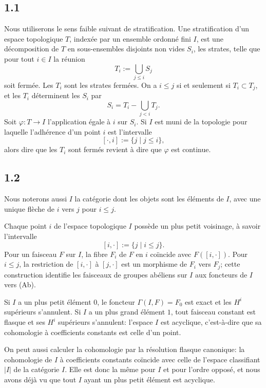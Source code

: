 \documentclass[11pt]{article}
\theoremstyle{definition}
\begin{document}
\subsection*{1.1}
Nous utiliserons le sens faible suivant de stratification. Une stratification d'un espace topologique $T$, indexée par un ensemble ordonné fini $I$, est une décomposition de $T$ en sous-ensembles disjoints non vides $S_i$, les strates, telle que pour tout $i\in I$ la réunion
\[
T_i:=\bigcup_{j\leq i}S_j
\]
soit fermée. Les $T_i$ sont les strates fermées. On a $i\leq j$ si et seulement si $T_i\subset T_j$, et les $T_i$ déterminent les $S_i$ par
\begin{equation}
S_i=T_i-\bigcup_{j<i}T_j.\tag{1.1.1}
\end{equation}
Soit $\varphi:T\to I$ l'application égale à $i$ sur $S_i$. Si $I$ est muni de la topologie pour laquelle l'adhérence d'un point $i$ est l'intervalle
\[
[\cdot,i]:=\{j\mid j\leq i\},
\]
alors dire que les $T_i$ sont fermés revient à dire que $\varphi$ est continue.

\subsection*{1.2}
Nous noterons aussi $I$ la catégorie dont les objets sont les éléments de $I$, avec une unique flèche de $i$ vers $j$ pour $i\leq j$.

Chaque point $i$ de l'espace topologique $I$ possède un plus petit voisinage, à savoir l'intervalle
\[
[i,\cdot]:=\{j\mid i\leq j\}.
\]
Pour un faisceau $F$ sur $I$, la fibre $F_i$ de $F$ en $i$ coïncide avec $F([i,\cdot])$. Pour $i\leq j$, la restriction de $[i,\cdot]$ à $[j,\cdot]$ est un morphisme de $F_i$ vers $F_j$; cette construction identifie les faisceaux de groupes abéliens sur $I$ aux foncteurs de $I$ vers \textup{(Ab)}.

Si $I$ a un plus petit élément $0$, le foncteur $\Gamma(I,F)=F_0$ est exact et les $H^i$ supérieurs s'annulent. Si $I$ a un plus grand élément $1$, tout faisceau constant est flasque et ses $H^i$ supérieurs s'annulent: l'espace $I$ est acyclique, c'est-à-dire que sa cohomologie à coefficients constants est celle d'un point.

On peut aussi calculer la cohomologie par la résolution flasque canonique: la cohomologie de $I$ à coefficients constants coïncide avec celle de l'espace classifiant $|I|$ de la catégorie $I$. Elle est donc la même pour $I$ et pour l'ordre opposé, et nous avons déjà vu que tout $I$ ayant un plus petit élément est acyclique.
\end{document}
